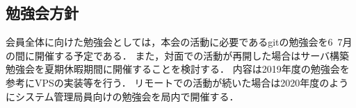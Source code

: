 \subsection*{勉強会方針}


会員全体に向けた勉強会としては，本会の活動に必要であるgitの勉強会を6~7月の間に開催する予定である．
また，対面での活動が再開した場合はサーバ構築勉強会を夏期休暇期間に開催することを検討する．
内容は2019年度の勉強会を参考にVPSの実装等を行う．
リモートでの活動が続いた場合は2020年度のようにシステム管理局員向けの勉強会を局内で開催する．


